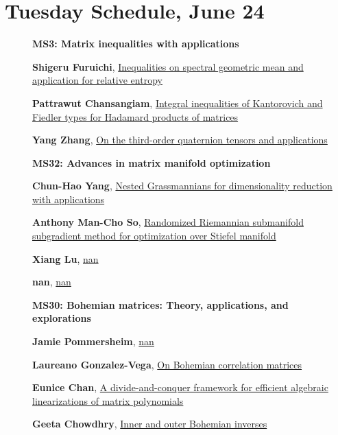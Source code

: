 \documentclass[ILAS2025-program.tex]{subfiles}
\begin{document}
    \newpage

\section*{Tuesday Schedule, June 24 }
        
        \begin{description}
    \item[] {\color{mstitle}\textbf{MS3: Matrix inequalities with applications}} 
    \item[] \hypertarget{up0144}{}\textbf{Shigeru Furuichi}, \hyperlink{down0144}{Inequalities on spectral geometric mean and application for relative entropy}
        \item[] \hypertarget{up0145}{}\textbf{Pattrawut Chansangiam}, \hyperlink{down0145}{Integral inequalities of Kantorovich and Fiedler types for Hadamard products of matrices}
        \item[] \hypertarget{up0146}{}\textbf{Yang Zhang}, \hyperlink{down0146}{On the third-order quaternion tensors and applications
}
        \end{description}
    \begin{description}
    \item[] {\color{mstitle}\textbf{MS32: Advances in matrix manifold optimization}} 
    \item[] \hypertarget{up0185}{}\textbf{Chun-Hao Yang}, \hyperlink{down0185}{Nested Grassmannians for dimensionality reduction with applications}
        \item[] \hypertarget{up0186}{}\textbf{Anthony Man-Cho So}, \hyperlink{down0186}{Randomized Riemannian submanifold subgradient method for optimization over Stiefel manifold}
        \item[] \hypertarget{up0187}{}\textbf{Xiang Lu}, \hyperlink{down0187}{nan}
        \item[] \hypertarget{up0188}{}\textbf{nan}, \hyperlink{down0188}{nan}
        \end{description}
    \begin{description}
    \item[] {\color{mstitle}\textbf{MS30: Bohemian matrices: Theory, applications, and explorations}} 
    \item[] \hypertarget{up0229}{}\textbf{Jamie Pommersheim}, \hyperlink{down0229}{nan}
        \item[] \hypertarget{up0230}{}\textbf{Laureano Gonzalez-Vega}, \hyperlink{down0230}{On Bohemian correlation matrices}
        \item[] \hypertarget{up0231}{}\textbf{Eunice Chan}, \hyperlink{down0231}{A divide-and-conquer framework for efficient algebraic linearizations of matrix polynomials}
        \item[] \hypertarget{up0232}{}\textbf{Geeta Chowdhry}, \hyperlink{down0232}{Inner and outer Bohemian inverses}
        \end{description}
\end{document}
